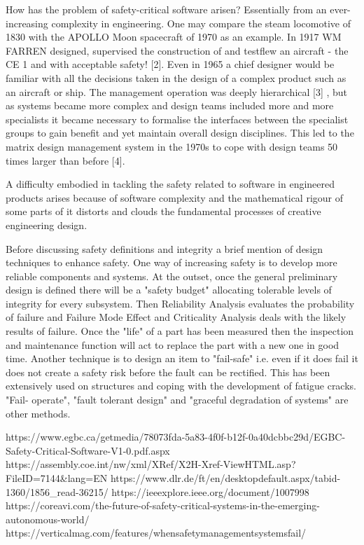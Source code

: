 How has the problem of safety-critical software arisen? Essentially from an ever-increasing complexity in engineering. One may compare the steam locomotive of 1830 with the APOLLO Moon spacecraft of 1970 as an example. In 1917 WM FARREN designed, supervised the construction of and testflew an aircraft - the CE 1 and with acceptable safety! [2]. Even in 1965 a chief designer would be familiar with all the decisions taken in the design of a complex product such as an aircraft or ship. The management operation was deeply hierarchical [3] , but as systems became more complex and design teams included more and more specialists it became necessary to formalise the interfaces between the specialist groups to gain benefit and yet maintain overall design disciplines. This led to the matrix design management system in the 1970s to cope with design teams 50 times larger than before [4].

A difficulty embodied in tackling the safety related to software in engineered products arises because of software complexity and the mathematical rigour of some parts of it distorts and clouds the fundamental processes of creative engineering design. 

Before discussing safety definitions and integrity a brief mention of design techniques to enhance safety. One way of increasing safety is to develop more reliable components and systems. At the outset, once the general preliminary design is defined there will be a "safety budget" allocating tolerable levels of integrity for every subsystem. Then Reliability Analysis evaluates the probability of failure and Failure Mode Effect and Criticality Analysis deals with the likely results of failure. Once the "life" of a part has been measured then the inspection and maintenance function will act to replace the part with a new one in good time. Another technique is to design an item to "fail-safe" i.e. even if it does fail it does not create a safety risk before the fault can be rectified. This has been extensively used on structures and coping with the development of fatigue cracks. "Fail- operate", "fault tolerant design" and "graceful degradation of systems" are other methods.



https://www.egbc.ca/getmedia/78073fda-5a83-4f0f-b12f-0a40dcbbc29d/EGBC-Safety-Critical-Software-V1-0.pdf.aspx
https://assembly.coe.int/nw/xml/XRef/X2H-Xref-ViewHTML.asp?FileID=7144&lang=EN
https://www.dlr.de/ft/en/desktopdefault.aspx/tabid-1360/1856_read-36215/
https://ieeexplore.ieee.org/document/1007998
https://coreavi.com/the-future-of-safety-critical-systems-in-the-emerging-autonomous-world/
https://verticalmag.com/features/whensafetymanagementsystemsfail/


